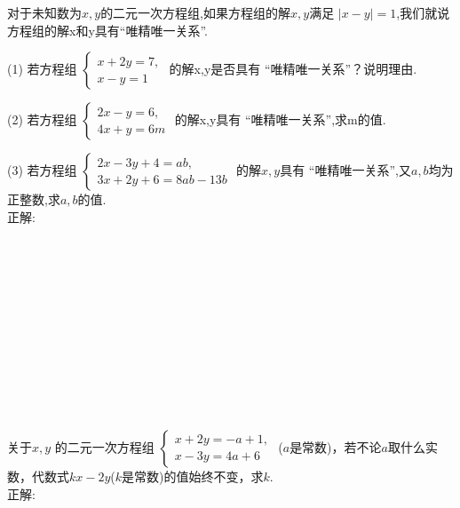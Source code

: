 \item {
    对于未知数为$x, y$的二元一次方程组,如果方程组的解$x,y$满足 $|x-y| = 1$,我们就说方程组的解x和y具有``唯精唯一关系''.

    (1) 若方程组
    $\begin{cases}
        x + 2y = 7, \\ 
        x - y = 1  
    \end{cases}$
    的解x,y是否具有 ``唯精唯一关系''？说明理由.

    (2) 若方程组
    $\begin{cases}
        2x - y = 6, \\ 
        4x + y = 6m  
    \end{cases}$
    的解x,y具有 ``唯精唯一关系'',求m的值.
    
    (3) 若方程组
    $\begin{cases}
        2x - 3y + 4 = ab, \\ 
        3x + 2y + 6 = 8ab - 13b  
    \end{cases}$
    的解$x,y$具有 ``唯精唯一关系'',又$a,b$均为正整数,求$a,b$的值.
    \ifshowSolution
        \fangsong{}
        \\
        正解:
    \else
        \\ \\ \\ \\ \\ \\ \\ \\ \\ \\ \\ \\
    \fi
}

\item {
    关于$x,y$ 的二元一次方程组
    $\begin{cases}
        x + 2y = -a+1, \\ 
        x - 3y = 4a + 6  
    \end{cases}$
    ($a$是常数)，若不论$a$取什么实数，代数式$kx - 2y$($k$是常数)的值始终不变，求$k$.
    \ifshowSolution
        \fangsong{}
        \\
        正解:
    \else
        \\ \\ \\ \\ \\
    \fi
}